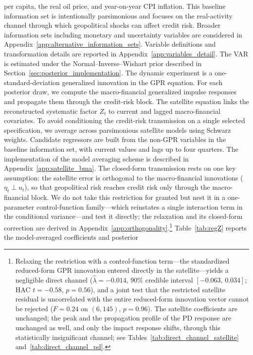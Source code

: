 per capita, the real oil price, and year-on-year CPI inflation. This baseline
information set is intentionally parsimonious and focuses on the real-activity
channel through which geopolitical shocks can affect credit risk. Broader
information sets including monetary and uncertainty variables are considered in
Appendix~\ref{app:alternative_information_sets}. Variable definitions and
transformation details are reported in Appendix~\ref{app:variables_detail}.
The VAR is estimated under the Normal--Inverse--Wishart prior described in
Section~\ref{sec:posterior_implementation}. The dynamic experiment is a
one-standard-deviation generalized innovation in the GPR equation. For each
posterior draw, we compute the macro-financial generalized impulse responses
and propagate them through the credit-risk block.
The satellite equation links the reconstructed systematic factor $Z_t$ to
current and lagged macro-financial covariates. To avoid conditioning the
credit-risk transmission on a single selected specification, we average across
parsimonious satellite models using Schwarz weights. Candidate regressors are
built from the non-GPR variables in the baseline information set, with current
values and lags up to four quarters. The implementation of the model averaging
scheme is described in Appendix~\ref{app:satellite_bma}.
The closed-form transmission rests on one key assumption: the satellite error is
orthogonal to the macro-financial innovations ($\eta_t \perp u_t$), so that
geopolitical risk reaches credit risk only through the macro-financial block. We
do not take this restriction for granted but nest it in a one-parameter
control-function family---which reinstates a single interaction term in the
conditional variance---and test it directly; the relaxation and its closed-form
correction are derived in Appendix~\ref{app:orthogonality}.\footnote{Relaxing
the restriction with a control-function term---the standardized reduced-form GPR
innovation entered directly in the satellite---yields a negligible direct
channel ($\widehat\lambda=-0.014$, $90\%$ credible interval
$[-0.063,\,0.034]$; HAC $t=-0.58$, $p=0.56$), and a joint test that the
restricted satellite residual is uncorrelated with the entire reduced-form
innovation vector cannot be rejected ($F=0.24$ on $(6,145)$, $p=0.96$). The
satellite coefficients are unchanged; the peak and the propagation profile of
the PD response are unchanged as well, and only the impact response shifts,
through this statistically insignificant channel; see
Tables~\ref{tab:direct_channel_satellite} and~\ref{tab:direct_channel_pd}.}
Table~\ref{tab:regZ} reports the model-averaged coefficients and posterior
